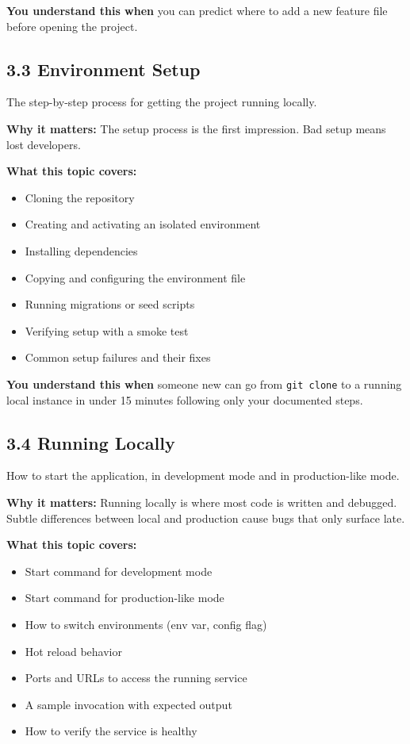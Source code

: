 \noindent{}\textbf{You understand this when} you can predict where to add a new feature file before opening the project.

\subsection*{3.3 Environment Setup}\label{project-planning-guide:33-environment-setup}

The step-by-step process for getting the project running locally.

\textbf{Why it matters:} The setup process is the first impression. Bad setup means lost developers.

\textbf{What this topic covers:}

\begin{itemize}
\tightlist
\item
  Cloning the repository
\item
  Creating and activating an isolated environment
\item
  Installing dependencies
\item
  Copying and configuring the environment file
\item
  Running migrations or seed scripts
\item
  Verifying setup with a smoke test
\item
  Common setup failures and their fixes
\end{itemize}

\noindent{}\textbf{You understand this when} someone new can go from \texttt{git\ clone} to a running local instance in under 15 minutes following only your documented steps.

\subsection*{3.4 Running Locally}\label{project-planning-guide:34-running-locally}

How to start the application, in development mode and in production-like mode.

\textbf{Why it matters:} Running locally is where most code is written and debugged. Subtle differences between local and production cause bugs that only surface late.

\textbf{What this topic covers:}

\begin{itemize}
\tightlist
\item
  Start command for development mode
\item
  Start command for production-like mode
\item
  How to switch environments (env var, config flag)
\item
  Hot reload behavior
\item
  Ports and URLs to access the running service
\item
  A sample invocation with expected output
\item
  How to verify the service is healthy
\end{itemize}

